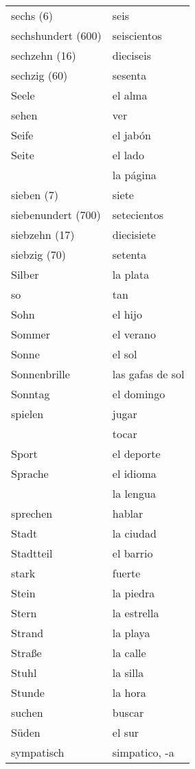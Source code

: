 \begin{longtable}{p{} p{}}
sechs (6) & seis\\
sechshundert (600) & seiscientos\\
sechzehn (16) & dieciseis\\
sechzig (60) & sesenta\\
Seele & el alma\\
sehen & ver\\
Seife & el jabón\\
Seite & el lado\\
~ & la página\\
sieben (7) & siete\\
siebenundert (700) & setecientos\\
siebzehn (17) & diecisiete\\
siebzig (70) & setenta\\
Silber & la plata\\
so & tan\\
Sohn & el hijo\\
Sommer & el verano\\
Sonne & el sol\\
Sonnenbrille & las gafas de sol\\
Sonntag & el domingo\\
spielen & jugar\\
~ & tocar\\
Sport & el deporte\\
Sprache & el idioma\\
~ & la lengua\\
sprechen & hablar\\
Stadt & la ciudad\\
Stadtteil & el barrio\\
stark & fuerte\\
Stein & la piedra\\
Stern & la estrella\\
Strand & la playa\\
Straße & la calle\\
Stuhl & la silla\\
Stunde & la hora\\
suchen & buscar\\
Süden & el sur\\
sympatisch & simpatico, -a\\
\end{longtable}
